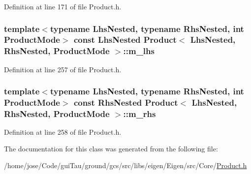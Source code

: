 Definition at line 171 of file Product.\-h.

\hypertarget{class_product_ab53fb2c36065209ef0e63910f1b20f60}{
\subsubsection[{m\-\_\-lhs}]{\setlength{\rightskip}{0pt plus 5cm}template$<$typename Lhs\-Nested, typename Rhs\-Nested, int Product\-Mode$>$ const Lhs\-Nested {\bf Product}$<$ Lhs\-Nested, Rhs\-Nested, Product\-Mode $>$\-::m\-\_\-lhs\hspace{0.3cm}{\ttfamily [protected]}}}\label{class_product_ab53fb2c36065209ef0e63910f1b20f60}


Definition at line 257 of file Product.\-h.

\hypertarget{class_product_acb2fc3355c62da64b8ddf4e7bec22ef8}{
\subsubsection[{m\-\_\-rhs}]{\setlength{\rightskip}{0pt plus 5cm}template$<$typename Lhs\-Nested, typename Rhs\-Nested, int Product\-Mode$>$ const Rhs\-Nested {\bf Product}$<$ Lhs\-Nested, Rhs\-Nested, Product\-Mode $>$\-::m\-\_\-rhs\hspace{0.3cm}{\ttfamily [protected]}}}\label{class_product_acb2fc3355c62da64b8ddf4e7bec22ef8}


Definition at line 258 of file Product.\-h.



The documentation for this class was generated from the following file\-:\begin{DoxyCompactItemize}
\item 
/home/jose/\-Code/gui\-Tau/ground/gcs/src/libs/eigen/\-Eigen/src/\-Core/\hyperlink{_product_8h}{Product.\-h}\end{DoxyCompactItemize}

